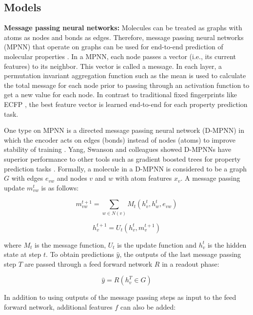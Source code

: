 \subsection{Models}

\noindent
\textbf{Message passing neural networks:} Molecules can be treated as graphs with atoms as nodes and bonds as edges. Therefore, message passing neural networks (MPNN) that operate on graphs can be used for end-to-end prediction of molecular properties \cite{Gilmer2017}.  In a MPNN, each node passes a vector (i.e., its current features) to its neighbor. This  vector is called a message. In each layer, a permutation invariant aggregation function such as the mean is used to calculate the total message for each node prior to passing through an activation function to get a new value for each node.  In contrast to traditional fixed fingerprints like ECFP \cite{Rogers2010}, the best feature vector is learned end-to-end for each property prediction task.

One type on MPNN is a directed message passing neural network (D-MPNN) in which the encoder acts on edges (bonds) instead of nodes (atoms) to improve stability of training \cite{Yang2019}. Yang, Swanson and colleagues showed D-MPNNs have superior performance to other tools such as gradient boosted trees for property prediction tasks \cite{Yang2019}. Formally, a molecule in a D-MPNN is considered to be a graph $G$ with edges $e_{vw}$ and nodes $v$ and $w$ with atom features $x_v$. A message passing update $m_{vw}^{t}$ is as follows:

\begin{equation}
    m_{vw}^{t+1} = \sum_{w\in N(v)} M_t(h_v^t, h_w^t, e_{vw})
\end{equation}

\begin{equation}
    h_v^{t+1} = U_t(h_v^t, m_v^{t+1})
\end{equation}

where $M_t$ is the message function, $U_t$ is the update function and $h_v^{t}$ is the hidden state at step $t$. To obtain predictions $\hat y$, the outputs of the last message passing step $T$ are passed through a feed forward network $R$ in a readout phase:
 
\begin{equation}
    \hat y = R(h_v^T \in G)
\end{equation}

In addition to using outputs of the message passing steps as input to the feed forward network, additional features $f$ can also be added:


